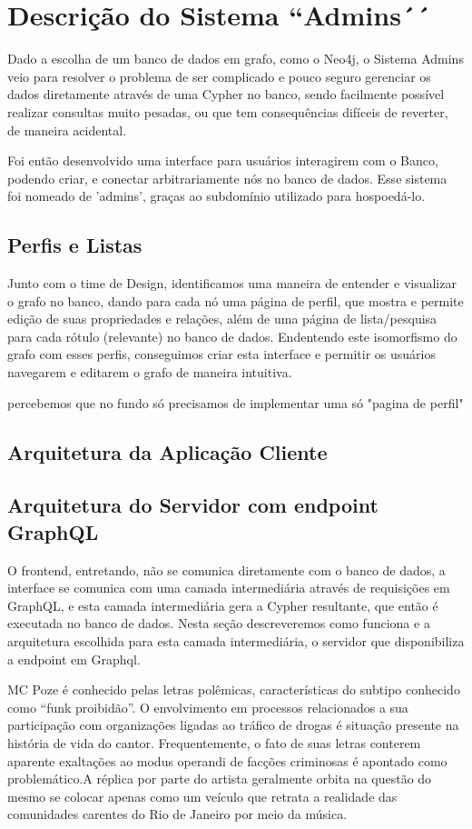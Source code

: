 \chapter{Descrição do Sistema ``Admins´´}
\label{chap4}

Dado a escolha de um banco de dados em grafo, como o Neo4j, o Sistema Admins veio para resolver o problema de ser complicado e pouco seguro gerenciar os dados diretamente através de uma Cypher no banco, sendo facilmente possível realizar consultas muito pesadas, ou que tem consequências difíceis de reverter, de maneira acidental.

Foi então desenvolvido uma interface para usuários interagirem com o Banco, podendo criar, e conectar arbitrariamente nós no banco de dados. Esse sistema foi nomeado de 'admins', graças ao subdomínio utilizado para hospoedá-lo.

\section{Perfis e Listas}

Junto com o time de Design, identificamos uma maneira de entender e visualizar o grafo no banco, dando para cada nó uma página de perfil, que mostra e permite edição de suas propriedades e relações, além de uma página de lista/pesquisa para cada rótulo (relevante) no banco de dados. Endentendo este isomorfismo do grafo com esses perfis, conseguimos criar esta interface e permitir os usuários navegarem e editarem o grafo de maneira intuitiva.

percebemos que no fundo só precisamos de implementar uma só "pagina de perfil"


\section{Arquitetura da Aplicação Cliente}


\section{Arquitetura do Servidor com endpoint GraphQL}

O frontend, entretando, não se comunica diretamente com o banco de dados, a interface se comunica com uma camada intermediária através de requisições em GraphQL, e esta camada intermediária gera a Cypher resultante, que então é executada no banco de dados. Nesta seção descreveremos como funciona e a arquitetura escolhida para esta camada intermediária, o servidor que disponibiliza a endpoint em Graphql.
 
MC Poze é conhecido pelas letras polêmicas, características do subtipo conhecido como ``funk proibidão''. O envolvimento em processos relacionados a sua participação com organizações ligadas ao tráfico de drogas é situação presente na história de vida do cantor. Frequentemente, o fato de suas letras conterem aparente exaltações ao modus operandi de facções criminosas é apontado como problemático.A réplica por parte do artista geralmente orbita na questão do mesmo se colocar apenas como um veículo que retrata a realidade das comunidades carentes do Rio de Janeiro por meio da música.